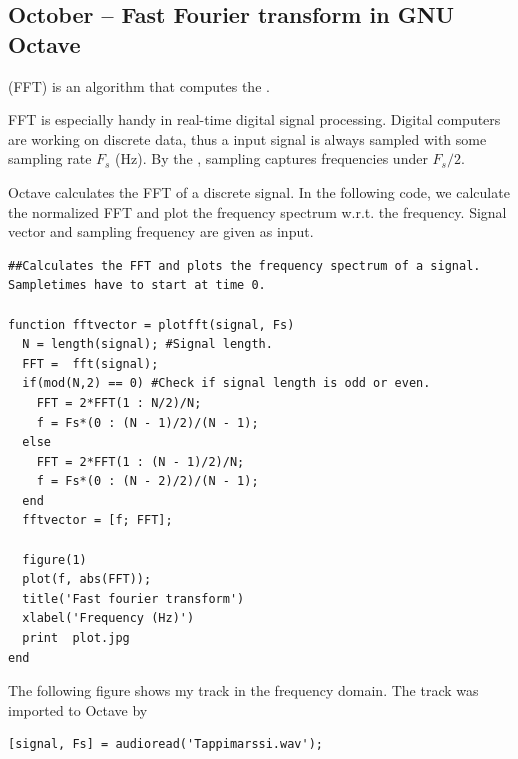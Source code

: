 \documentclass{article}
\begin{document}
    \subsection{October – Fast Fourier transform in GNU Octave}

     (FFT) is an algorithm that computes the .

    FFT is especially handy in real-time digital signal processing. Digital computers are working on discrete data, thus a input signal is always sampled with some sampling rate $F_s$ (Hz). By the , sampling captures frequencies under $F_s/2$.

    Octave calculates the FFT of a discrete signal.  In the following code, we calculate the normalized FFT and plot the frequency spectrum w.r.t. the frequency. Signal vector and sampling frequency are given as input.

\begin{verbatim}
##Calculates the FFT and plots the frequency spectrum of a signal. Sampletimes have to start at time 0.

function fftvector = plotfft(signal, Fs)
  N = length(signal); #Signal length.
  FFT =  fft(signal);
  if(mod(N,2) == 0) #Check if signal length is odd or even.
    FFT = 2*FFT(1 : N/2)/N;
    f = Fs*(0 : (N - 1)/2)/(N - 1); 
  else
    FFT = 2*FFT(1 : (N - 1)/2)/N;
    f = Fs*(0 : (N - 2)/2)/(N - 1);
  end  
  fftvector = [f; FFT];
  
  figure(1)
  plot(f, abs(FFT));
  title('Fast fourier transform')
  xlabel('Frequency (Hz)')
  print  plot.jpg
end

\end{verbatim}

The following figure shows my track  in the frequency domain. The track was imported to Octave by

\begin{verbatim}
[signal, Fs] = audioread('Tappimarssi.wav');
\end{verbatim}
\end{document}
